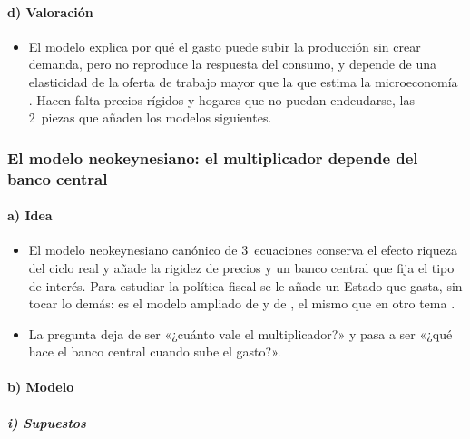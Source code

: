 \documentclass[11pt]{article}
\begin{document}
\paragraph{d) Valoración}

\begin{itemize}
\item El modelo explica por qué el gasto puede subir la producción sin crear demanda, pero no reproduce la respuesta del consumo, y depende de una elasticidad de la oferta de trabajo mayor que la que estima la microeconomía . Hacen falta precios rígidos y hogares que no puedan endeudarse, las 2~piezas que añaden los modelos siguientes.
\end{itemize}

\subsubsection{El modelo neokeynesiano: el multiplicador depende del banco central}\label{sec:neokeynesiano}

\paragraph{a) Idea}

\begin{itemize}
\item El modelo neokeynesiano canónico de 3~ecuaciones  conserva el efecto riqueza del ciclo real y añade la rigidez de precios y un banco central que fija el tipo de interés. Para estudiar la política fiscal se le añade un Estado que gasta, sin tocar lo demás: es el modelo ampliado de \textcite{Woodford2011Simple} y de \textcite[cap.~3]{Gali2015Monetary}, el mismo que en otro tema .
\item La pregunta deja de ser «¿cuánto vale el multiplicador?» y pasa a ser «¿qué hace el banco central cuando sube el gasto?».
\end{itemize}

\paragraph{b) Modelo}

\subparagraph{i) Supuestos}
\end{document}
